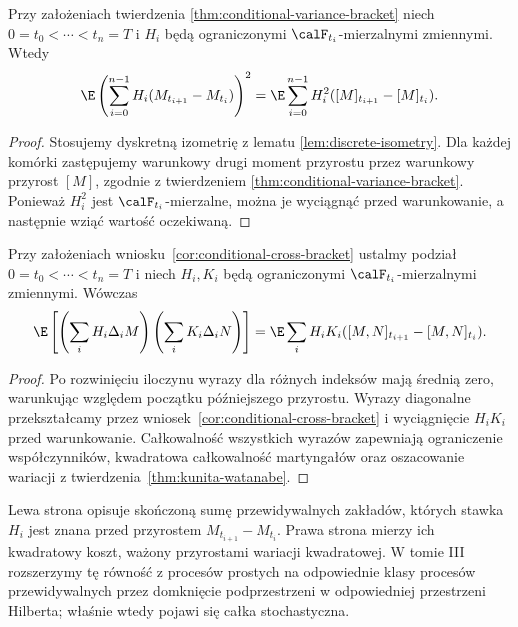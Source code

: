 \begin{wniosek}
\label{cor:elementary-bracket-isometry}
Przy założeniach twierdzenia
\ref{thm:conditional-variance-bracket} niech
$0=t_0<\cdots<t_n=T$ i $H_i$ będą ograniczonymi
$\calF_{t_i}$-mierzalnymi zmiennymi. Wtedy
\[
\E\left(\sum_{i=0}^{n-1}H_i(M_{t_{i+1}}-M_{t_i})\right)^2
=\E\sum_{i=0}^{n-1}H_i^2
([M]_{t_{i+1}}-[M]_{t_i}).
\]
\end{wniosek}
\begin{proof}
Stosujemy dyskretną izometrię z lematu
\ref{lem:discrete-isometry}. Dla każdej komórki
zastępujemy warunkowy drugi moment przyrostu przez
warunkowy przyrost $[M]$, zgodnie z twierdzeniem
\ref{thm:conditional-variance-bracket}. Ponieważ $H_i^2$ jest
$\calF_{t_i}$-mierzalne, można je wyciągnąć przed
warunkowanie, a następnie wziąć wartość oczekiwaną.
\end{proof}

\begin{wniosek}
\label{cor:elementary-cross-isometry}
Przy założeniach wniosku~\ref{cor:conditional-cross-bracket}
ustalmy podział $0=t_0<\cdots<t_n=T$
i niech $H_i,K_i$ będą ograniczonymi
$\calF_{t_i}$-mierzalnymi zmiennymi.
Wówczas
\[
\E\left[
\left(\sum_i H_i\Delta_i M\right)
\left(\sum_i K_i\Delta_i N\right)
\right]
=\E\sum_i H_iK_i
([M,N]_{t_{i+1}}-[M,N]_{t_i}).
\]
\end{wniosek}
\begin{proof}
Po rozwinięciu iloczynu wyrazy dla różnych
indeksów mają średnią zero, warunkując względem
początku późniejszego przyrostu.
Wyrazy diagonalne przekształcamy przez
wniosek~\ref{cor:conditional-cross-bracket}
i wyciągnięcie $H_iK_i$ przed warunkowanie.
Całkowalność wszystkich wyrazów zapewniają
ograniczenie współczynników, kwadratowa
całkowalność martyngałów oraz oszacowanie
wariacji z twierdzenia~\ref{thm:kunita-watanabe}.
\end{proof}

\begin{uwaga}
Lewa strona opisuje skończoną sumę przewidywalnych
zakładów, których stawka $H_i$ jest znana przed
przyrostem $M_{t_{i+1}}-M_{t_i}$. Prawa strona
mierzy ich kwadratowy koszt, ważony przyrostami
wariacji kwadratowej. W tomie III rozszerzymy tę
równość z procesów prostych na odpowiednie klasy
procesów przewidywalnych przez domknięcie podprzestrzeni w odpowiedniej przestrzeni
Hilberta; właśnie wtedy pojawi się całka stochastyczna.
\end{uwaga}

